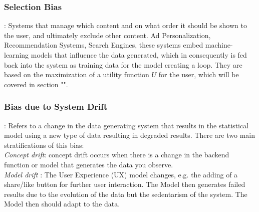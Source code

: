 \subsubsection{Selection Bias}:
Systems that manage which content and on what order it should be shown to the user, and ultimately exclude other content. Ad Personalization, Recommendation Systems, Search Engines, these systems embed machine-learning models that influence the data generated, which in consequently is fed back into the system as training data for the model creating a loop. They are based on the maximization of a  utility function $U$ for the user, which will be covered in section "".\\

\subsubsection{Bias due to System Drift}:
Refers to a change in the data generating system that results in the statistical model using a new type of data resulting in degraded results. There are two main stratifications of this bias:\\
\textsl{Concept drift}: concept drift occurs when there is a change in the backend function or model that generates the data you observe.\\
\textsl{Model drift} : The User Experience (UX) model changes, e.g. the adding of a share/like button for further user interaction.
The Model then generates failed results due to the evolution of the data but the sedentarism of the system. The Model then should adapt to the data.
